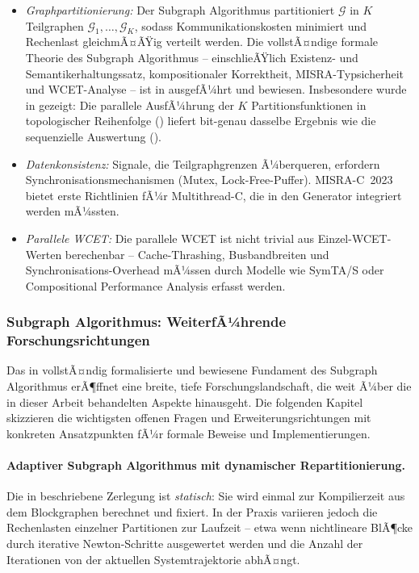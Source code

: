 ﻿\documentclass[12pt,a4paper]{article}
\theoremstyle{definition}
\begin{document}
\begin{itemize}
  \item \emph{Graphpartitionierung:} Der Subgraph Algorithmus
        \cite{subgraph2026} partitioniert $\mathcal{G}$ in $K$ Teilgraphen
        $\mathcal{G}_1, \ldots, \mathcal{G}_K$, sodass
        Kommunikationskosten minimiert und Rechenlast gleichmÃ¤ÃŸig
        verteilt werden. Die vollstÃ¤ndige formale Theorie des Subgraph
        Algorithmus -- einschlieÃŸlich Existenz- und Semantikerhaltungssatz,
        kompositionaler Korrektheit, MISRA-Typsicherheit und WCET-Analyse --
        ist in  ausgefÃ¼hrt und bewiesen.
        Insbesondere wurde in  gezeigt:
        Die parallele AusfÃ¼hrung der $K$ Partitionsfunktionen in
        topologischer Reihenfolge () liefert
        bit-genau dasselbe Ergebnis wie die sequenzielle Auswertung
        ().

  \item \emph{Datenkonsistenz:} Signale, die Teilgraphgrenzen
        Ã¼berqueren, erfordern Synchronisationsmechanismen (Mutex,
        Lock-Free-Puffer). MISRA-C~2023 bietet erste Richtlinien fÃ¼r
        Multithread-C, die in den Generator integriert werden mÃ¼ssten.

  \item \emph{Parallele WCET:} Die parallele WCET ist nicht trivial
        aus Einzel-WCET-Werten berechenbar -- Cache-Thrashing,
        Busbandbreiten und Synchronisations-Overhead mÃ¼ssen durch
        Modelle wie SymTA/S oder Compositional Performance Analysis
        erfasst werden.
\end{itemize}

\subsubsection{Subgraph Algorithmus: WeiterfÃ¼hrende Forschungsrichtungen}
\label{subsubsec:subgraph-future}

Das in  vollstÃ¤ndig formalisierte und bewiesene
Fundament des Subgraph Algorithmus erÃ¶ffnet eine breite, tiefe
Forschungslandschaft, die weit Ã¼ber die in dieser Arbeit behandelten
Aspekte hinausgeht. Die folgenden Kapitel skizzieren die wichtigsten
offenen Fragen und Erweiterungsrichtungen mit konkreten Ansatzpunkten
fÃ¼r formale Beweise und Implementierungen.

\paragraph{Adaptiver Subgraph Algorithmus mit dynamischer Repartitionierung.}
Die in  beschriebene Zerlegung ist \emph{statisch}:
Sie wird einmal zur Kompilierzeit aus dem Blockgraphen berechnet und
fixiert. In der Praxis variieren jedoch die Rechenlasten einzelner
Partitionen zur Laufzeit -- etwa wenn nichtlineare BlÃ¶cke durch
iterative Newton-Schritte ausgewertet werden und die Anzahl der
Iterationen von der aktuellen Systemtrajektorie abhÃ¤ngt.
\end{document}
